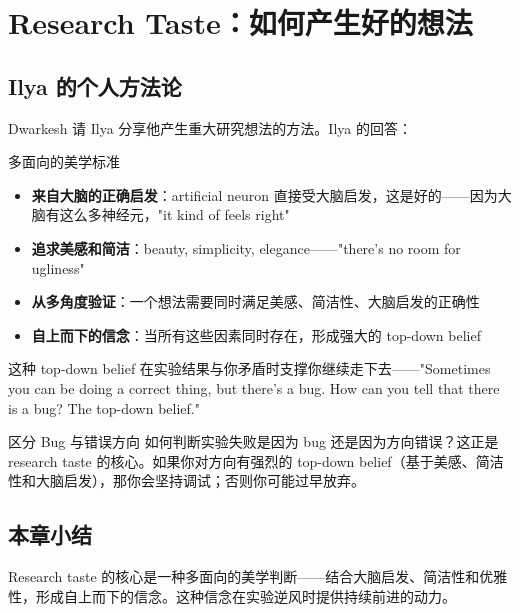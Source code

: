 \section{Research Taste：如何产生好的想法}

\subsection{Ilya 的个人方法论}

Dwarkesh 请 Ilya 分享他产生重大研究想法的方法。Ilya 的回答：

\begin{importantbox}{多面向的美学标准}
\begin{itemize}
    \item \textbf{来自大脑的正确启发}：artificial neuron 直接受大脑启发，这是好的——因为大脑有这么多神经元，"it kind of feels right"
    \item \textbf{追求美感和简洁}：beauty, simplicity, elegance——"there's no room for ugliness"
    \item \textbf{从多角度验证}：一个想法需要同时满足美感、简洁性、大脑启发的正确性
    \item \textbf{自上而下的信念}：当所有这些因素同时存在，形成强大的 top-down belief
\end{itemize}
这种 top-down belief 在实验结果与你矛盾时支撑你继续走下去——"Sometimes you can be doing a correct thing, but there's a bug. How can you tell that there is a bug? The top-down belief."
\end{importantbox}

\begin{knowledgebox}{区分 Bug 与错误方向}
如何判断实验失败是因为 bug 还是因为方向错误？这正是 research taste 的核心。如果你对方向有强烈的 top-down belief（基于美感、简洁性和大脑启发），那你会坚持调试；否则你可能过早放弃。
\end{knowledgebox}

\subsection{本章小结}

Research taste 的核心是一种多面向的美学判断——结合大脑启发、简洁性和优雅性，形成自上而下的信念。这种信念在实验逆风时提供持续前进的动力。


